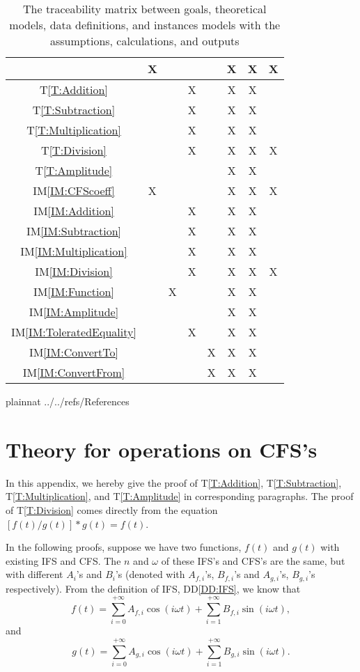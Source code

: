\documentclass[12pt]{article}
\newcommand{\ddref}[1]{DD\ref{#1}}
\newcommand{\tref}[1]{T\ref{#1}}
\newcommand{\iref}[1]{IM\ref{#1}}
\begin{document}
\begin{table}
\begin{tabular}{|c|c|c|c|c|c|c|c|}
		&X& & & &X&X&X\\\hline
		\tref{T:Addition}
		& & &X& &X&X& \\\hline
		\tref{T:Subtraction}
		& & &X& &X&X& \\\hline
		\tref{T:Multiplication}
		& & &X& &X&X& \\\hline
		\tref{T:Division}
		& & &X& &X&X&X\\\hline
		\tref{T:Amplitude}
		& & & & &X&X& \\\hline
		\iref{IM:CFScoeff}
		&X& & & &X&X&X\\\hline
		\iref{IM:Addition}
		& & &X& &X&X& \\\hline
		\iref{IM:Subtraction}
		& & &X& &X&X& \\\hline
		\iref{IM:Multiplication}
		& & &X& &X&X& \\\hline
		\iref{IM:Division}
		& & &X& &X&X&X\\\hline
		\iref{IM:Function}
		& &X& & &X&X& \\\hline
		\iref{IM:Amplitude}
		& & & & &X&X& \\\hline
		\iref{IM:ToleratedEquality}
		& & &X& &X&X& \\\hline
		\iref{IM:ConvertTo}
		& & & &X&X&X& \\\hline
		\iref{IM:ConvertFrom}
		& & & &X&X&X& \\\hline		
	\end{tabular}
	\caption{The traceability matrix between goals, 
	theoretical models, data definitions, and instances models 
	with the assumptions, calculations, and outputs}
	\label{Table:Traceability}
\end{table} 
\newpage

 {plainnat}
 {../../refs/References}

\newpage
\appendix

\section{Theory for operations on CFS's}\label{Appendix:Operations}
In this appendix, we hereby give the proof of 
\tref{T:Addition}, \tref{T:Subtraction}, \tref{T:Multiplication}, 
and \tref{T:Amplitude} in corresponding paragraphs. The proof of 
\tref{T:Division} comes directly from the equation 
$[f(t)/g(t)]*g(t)=f(t)$.

In the following proofs, suppose we have two functions, 
$f(t)$ and $g(t)$ with existing IFS and CFS. The $n$ and $\omega$ of 
these IFS's and CFS's are the same, but with different $A_i$'s and $B_i$'s 
(denoted with $A_{f, i}$'s, $B_{f, i}$'s and $A_{g,i}$'s, 
$B_{g,i}$'s respectively).
From the definition of IFS, \ddref{DD:IFS}, we know that 
\begin{equation}\label{Eq:fDef}
	f(t)=\sum_{i=0}^{+\infty}A_{f, i}\cos(i\omega t)
	+\sum_{i=1}^{+\infty}B_{f, i}\sin(i\omega t),
\end{equation} and \begin{equation}\label{Eq:gDef}
	g(t)=\sum_{i=0}^{+\infty}A_{g, i}\cos(i\omega t)
	+\sum_{i=1}^{+\infty}B_{g, i}\sin(i\omega t).
\end{equation}  
\end{document}
